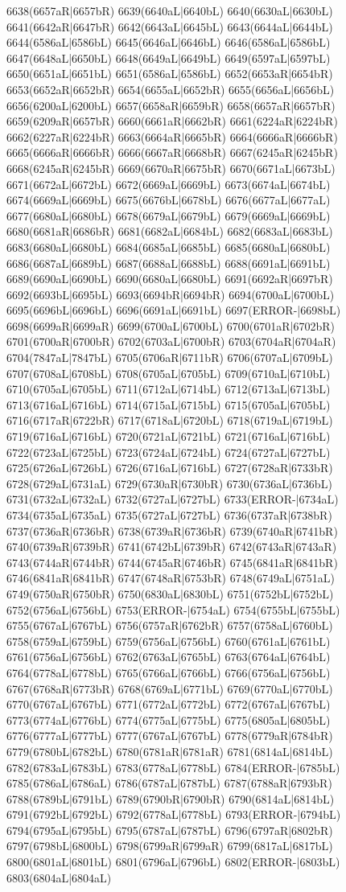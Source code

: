 6638(6657aR|6657bR) 6639(6640aL|6640bL) 6640(6630aL|6630bL) 6641(6642aR|6647bR) 6642(6643aL|6645bL) 6643(6644aL|6644bL) 6644(6586aL|6586bL) 6645(6646aL|6646bL) 6646(6586aL|6586bL) 6647(6648aL|6650bL) 6648(6649aL|6649bL) 6649(6597aL|6597bL) 6650(6651aL|6651bL) 6651(6586aL|6586bL) 6652(6653aR|6654bR) 6653(6652aR|6652bR) 6654(6655aL|6652bR) 6655(6656aL|6656bL) 6656(6200aL|6200bL) 6657(6658aR|6659bR) 6658(6657aR|6657bR) 6659(6209aR|6657bR) 6660(6661aR|6662bR) 6661(6224aR|6224bR) 6662(6227aR|6224bR) 6663(6664aR|6665bR) 6664(6666aR|6666bR) 6665(6666aR|6666bR) 6666(6667aR|6668bR) 6667(6245aR|6245bR) 6668(6245aR|6245bR) 6669(6670aR|6675bR) 6670(6671aL|6673bL) 6671(6672aL|6672bL) 6672(6669aL|6669bL) 6673(6674aL|6674bL) 6674(6669aL|6669bL) 6675(6676bL|6678bL) 6676(6677aL|6677aL) 6677(6680aL|6680bL) 6678(6679aL|6679bL) 6679(6669aL|6669bL) 6680(6681aR|6686bR) 6681(6682aL|6684bL) 6682(6683aL|6683bL) 6683(6680aL|6680bL) 6684(6685aL|6685bL) 6685(6680aL|6680bL) 6686(6687aL|6689bL) 6687(6688aL|6688bL) 6688(6691aL|6691bL) 6689(6690aL|6690bL) 6690(6680aL|6680bL) 6691(6692aR|6697bR) 6692(6693bL|6695bL) 6693(6694bR|6694bR) 6694(6700aL|6700bL) 6695(6696bL|6696bL) 6696(6691aL|6691bL) 6697(ERROR-|6698bL) 6698(6699aR|6699aR) 6699(6700aL|6700bL) 6700(6701aR|6702bR) 6701(6700aR|6700bR) 6702(6703aL|6700bR) 6703(6704aR|6704aR) 6704(7847aL|7847bL) 6705(6706aR|6711bR) 6706(6707aL|6709bL) 6707(6708aL|6708bL) 6708(6705aL|6705bL) 6709(6710aL|6710bL) 6710(6705aL|6705bL) 6711(6712aL|6714bL) 6712(6713aL|6713bL) 6713(6716aL|6716bL) 6714(6715aL|6715bL) 6715(6705aL|6705bL) 6716(6717aR|6722bR) 6717(6718aL|6720bL) 6718(6719aL|6719bL) 6719(6716aL|6716bL) 6720(6721aL|6721bL) 6721(6716aL|6716bL) 6722(6723aL|6725bL) 6723(6724aL|6724bL) 6724(6727aL|6727bL) 6725(6726aL|6726bL) 6726(6716aL|6716bL) 6727(6728aR|6733bR) 6728(6729aL|6731aL) 6729(6730aR|6730bR) 6730(6736aL|6736bL) 6731(6732aL|6732aL) 6732(6727aL|6727bL) 6733(ERROR-|6734aL) 6734(6735aL|6735aL) 6735(6727aL|6727bL) 6736(6737aR|6738bR) 6737(6736aR|6736bR) 6738(6739aR|6736bR) 6739(6740aR|6741bR) 6740(6739aR|6739bR) 6741(6742bL|6739bR) 6742(6743aR|6743aR) 6743(6744aR|6744bR) 6744(6745aR|6746bR) 6745(6841aR|6841bR) 6746(6841aR|6841bR) 6747(6748aR|6753bR) 6748(6749aL|6751aL) 6749(6750aR|6750bR) 6750(6830aL|6830bL) 6751(6752bL|6752bL) 6752(6756aL|6756bL) 6753(ERROR-|6754aL) 6754(6755bL|6755bL) 6755(6767aL|6767bL) 6756(6757aR|6762bR) 6757(6758aL|6760bL) 6758(6759aL|6759bL) 6759(6756aL|6756bL) 6760(6761aL|6761bL) 6761(6756aL|6756bL) 6762(6763aL|6765bL) 6763(6764aL|6764bL) 6764(6778aL|6778bL) 6765(6766aL|6766bL) 6766(6756aL|6756bL) 6767(6768aR|6773bR) 6768(6769aL|6771bL) 6769(6770aL|6770bL) 6770(6767aL|6767bL) 6771(6772aL|6772bL) 6772(6767aL|6767bL) 6773(6774aL|6776bL) 6774(6775aL|6775bL) 6775(6805aL|6805bL) 6776(6777aL|6777bL) 6777(6767aL|6767bL) 6778(6779aR|6784bR) 6779(6780bL|6782bL) 6780(6781aR|6781aR) 6781(6814aL|6814bL) 6782(6783aL|6783bL) 6783(6778aL|6778bL) 6784(ERROR-|6785bL) 6785(6786aL|6786aL) 6786(6787aL|6787bL) 6787(6788aR|6793bR) 6788(6789bL|6791bL) 6789(6790bR|6790bR) 6790(6814aL|6814bL) 6791(6792bL|6792bL) 6792(6778aL|6778bL) 6793(ERROR-|6794bL) 6794(6795aL|6795bL) 6795(6787aL|6787bL) 6796(6797aR|6802bR) 6797(6798bL|6800bL) 6798(6799aR|6799aR) 6799(6817aL|6817bL) 6800(6801aL|6801bL) 6801(6796aL|6796bL) 6802(ERROR-|6803bL) 6803(6804aL|6804aL) 
